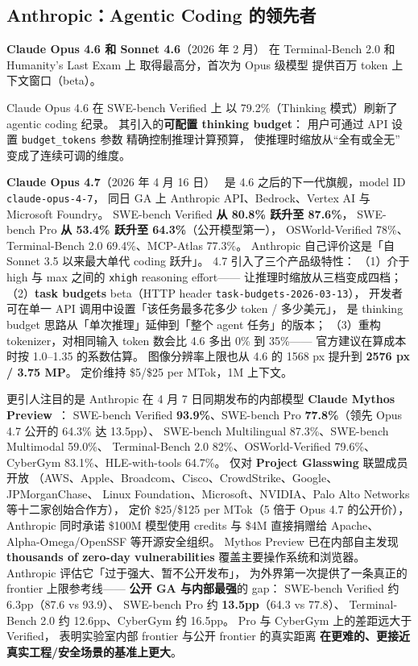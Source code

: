 \subsection{Anthropic：Agentic Coding 的领先者}

\textbf{Claude Opus 4.6 和 Sonnet 4.6}（2026 年 2 月）
在 Terminal-Bench 2.0 和 Humanity's Last Exam 上
取得最高分，首次为 Opus 级模型
提供百万 token 上下文窗口（beta）。

Claude Opus 4.6 在 SWE-bench Verified 上
以 79.2\%（Thinking 模式）刷新了 agentic coding 纪录。
其引入的\textbf{可配置 thinking budget}：
用户可通过 API 设置 \texttt{budget\_tokens} 参数
精确控制推理计算预算，
使推理时缩放从“全有或全无”
变成了连续可调的维度。

\textbf{Claude Opus 4.7}（2026 年 4 月 16 日）~\cite{anthropicopus47}
是 4.6 之后的下一代旗舰，model ID \texttt{claude-opus-4-7}，
同日 GA 上 Anthropic API、Bedrock、Vertex AI 与 Microsoft Foundry。
SWE-bench Verified \textbf{从 80.8\% 跃升至 87.6\%}，
SWE-bench Pro \textbf{从 53.4\% 跃升至 64.3\%}（公开模型第一），
OSWorld-Verified 78\%、Terminal-Bench 2.0 69.4\%、MCP-Atlas 77.3\%。
Anthropic 自己评价这是「自 Sonnet 3.5 以来最大单代 coding 跃升」。
4.7 引入了三个产品级特性：
（1）介于 high 与 max 之间的 \texttt{xhigh} reasoning effort——
让推理时缩放从三档变成四档；
（2）\textbf{task budgets} beta（HTTP header \texttt{task-budgets-2026-03-13}），
开发者可在单一 API 调用中设置「该任务最多花多少 token / 多少美元」，
是 thinking budget 思路从「单次推理」延伸到「整个 agent 任务」的版本；
（3）重构 tokenizer，对相同输入 token 数会比 4.6 多出 0\% 到 35\%——
官方建议在算成本时按 1.0--1.35 的系数估算。
图像分辨率上限也从 4.6 的 1568 px 提升到 \textbf{2576 px / 3.75 MP}。
定价维持 \$5/\$25 per MTok，1M 上下文。

更引人注目的是 Anthropic 在 4 月 7 日同期发布的内部模型
\textbf{Claude Mythos Preview}~\cite{anthropicmythos,anthropicglasswing2026}：
SWE-bench Verified \textbf{93.9\%}、SWE-bench Pro \textbf{77.8\%}（领先 Opus 4.7 公开的 64.3\% 达 13.5pp）、
SWE-bench Multilingual 87.3\%、SWE-bench Multimodal 59.0\%、
Terminal-Bench 2.0 82\%、OSWorld-Verified 79.6\%、CyberGym 83.1\%、HLE-with-tools 64.7\%。
仅对 \textbf{Project Glasswing} 联盟成员开放
（AWS、Apple、Broadcom、Cisco、CrowdStrike、Google、JPMorganChase、
Linux Foundation、Microsoft、NVIDIA、Palo Alto Networks 等十二家创始合作方），
定价 \$25/\$125 per MTok（5 倍于 Opus 4.7 的公开价），
Anthropic 同时承诺 \$100M 模型使用 credits 与 \$4M 直接捐赠给 Apache、
Alpha-Omega/OpenSSF 等开源安全组织。
Mythos Preview 已在内部自主发现 \textbf{thousands of zero-day vulnerabilities}
覆盖主要操作系统和浏览器。
Anthropic 评估它「过于强大、暂不公开发布」，
为外界第一次提供了一条真正的 frontier 上限参考线——
\textbf{公开 GA 与内部最强}的 gap：
SWE-bench Verified 约 6.3pp（87.6 vs 93.9）、
SWE-bench Pro 约 \textbf{13.5pp}（64.3 vs 77.8）、
Terminal-Bench 2.0 约 12.6pp、CyberGym 约 16.5pp。
Pro 与 CyberGym 上的差距远大于 Verified，
表明实验室内部 frontier 与公开 frontier 的真实距离
\textbf{在更难的、更接近真实工程/安全场景的基准上更大}。

